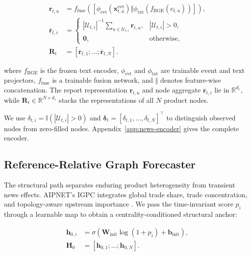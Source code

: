 \documentclass[letterpaper]{article} %
\begin{document}
\begin{equation}
\begin{aligned}
\mathbf r_{t,u}
&=f_{\mathrm{fuse}}\!\left(
 [\phi_{\mathrm{evt}}(\mathbf x^{\mathrm{evt}}_{t,u})\Vert
\phi_{\mathrm{txt}}(f_{\mathrm{BGE}}(c_{t,u}))]
\right),\\
\overline{\mathbf r}_{t,i}
&=\begin{cases}
|\mathcal U_{t,i}|^{-1}\sum_{u\in\mathcal U_{t,i}}\mathbf r_{t,u},
&|\mathcal U_{t,i}|>0,\\
\mathbf 0,&\text{otherwise},
\end{cases}\\
\mathbf R_t&=[\overline{\mathbf r}_{t,1};\ldots;\overline{\mathbf r}_{t,N}].
\end{aligned}
\label{eq:news-graph-encoding}
\end{equation}

where \(f_{\mathrm{BGE}}\) is the frozen text encoder, \(\phi_{\mathrm{evt}}\) and \(\phi_{\mathrm{txt}}\) are trainable event and text projectors, \(f_{\mathrm{fuse}}\) is a trainable fusion network, and \(\Vert\) denotes feature-wise concatenation. The report representation \(\mathbf r_{t,u}\) and node aggregate \(\overline{\mathbf r}_{t,i}\) lie in \(\mathbb R^{d_r}\), while \(\mathbf R_t\in\mathbb R^{N\times d_r}\) stacks the representations of all \(N\) product nodes.

We use \(\delta_{t,i}=\mathbb{I}(|\mathcal U_{t,i}|>0)\) and \(\boldsymbol\delta_t=[\delta_{t,1},\ldots,\delta_{t,N}]^\top\) to distinguish observed nodes from zero-filled nodes. Appendix~\ref{app:news-encoder} gives the complete encoder.

\subsection{Reference-Relative Graph Forecaster}

The structural path separates enduring product heterogeneity from transient news effects. AIPNET's IGPC integrates global trade share, trade concentration, and topology-aware upstream importance \cite{fetzer2024ai}. We pass the time-invariant score \(p_i\) through a learnable map to obtain a centrality-conditioned structural anchor:

\begin{equation}
\begin{aligned}
\mathbf h_{0,i}
&=\sigma\!\left(
\mathbf W_{\mathrm{init}}\log(1+p_i)+\mathbf b_{\mathrm{init}}
\right),\\
\mathbf H_0
&=[\mathbf h_{0,1};\ldots;\mathbf h_{0,N}].
\end{aligned}
\label{eq:structural-anchor}
\end{equation}
\end{document}
